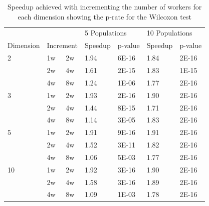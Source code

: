 \documentclass[review]{elsarticle}
\begin{document}
\begin{table}[h!tbp]
  \small
  \caption{Speedup achieved with incrementing the number of workers for each dimension showing the p-rate for the Wilcoxon test}
  \label{tab:speedup:test}
  \vspace{0.25cm}
  \centering
  \begin{tabular}{lllllll}
            &               &               & \multicolumn{2}{l}{5 Populations} & \multicolumn{2}{l}{10 Populations} \\
  Dimension & \multicolumn{2}{l}{Increment} & Speedup         & p-value         & Speedup          & p-value         \\
  2         & 1w            & 2w            & 1.94            & 6E-16           & 1.84             & 2E-16           \\
            & 2w            & 4w            & 1.61            & 2E-15           & 1.83             & 1E-15           \\
            & 4w            & 8w            & 1.24            & 1E-06           & 1.77             & 2E-16           \\
  3         & 1w            & 2w            & 1.93            & 2E-16           & 1.90             & 2E-16           \\
            & 2w            & 4w            & 1.44            & 8E-15           & 1.71             & 2E-16           \\
            & 4w            & 8w            & 1.14            & 3E-05           & 1.83             & 2E-16           \\
  5         & 1w            & 2w            & 1.91            & 9E-16           & 1.91             & 2E-16           \\
            & 2w            & 4w            & 1.52            & 3E-11           & 1.82             & 2E-16           \\
            & 4w            & 8w            & 1.06            & 5E-03           & 1.77             & 2E-16           \\
  10        & 1w            & 2w            & 1.92            & 3E-16           & 1.90             & 2E-16           \\
            & 2w            & 4w            & 1.58            & 3E-16           & 1.89             & 2E-16           \\
            & 4w            & 8w            & 1.09            & 1E-03           & 1.78             & 2E-16           \\

\end{tabular}
\end{table}
\end{document}
